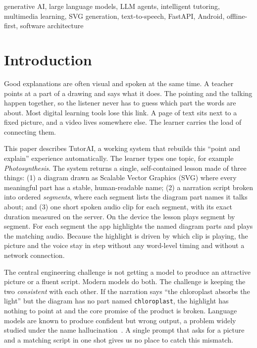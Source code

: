 \documentclass[conference]{IEEEtran}
\begin{document}
\begin{IEEEkeywords}
generative AI, large language models, LLM agents, intelligent tutoring,
multimedia learning, SVG generation, text-to-speech, FastAPI, Android,
offline-first, software architecture
\end{IEEEkeywords}

\section{Introduction}

Good explanations are often visual and spoken at the same time. A teacher
points at a part of a drawing and says what it does. The pointing and the
talking happen together, so the listener never has to guess which part the
words are about. Most digital learning tools lose this link. A page of text
sits next to a fixed picture, and a video lives somewhere else. The learner
carries the load of connecting them.

This paper describes TutorAI, a working system that rebuilds this ``point and
explain'' experience automatically. The learner types one topic, for example
\emph{Photosynthesis}. The system returns a single, self-contained lesson made
of three things: (1) a diagram drawn as Scalable Vector Graphics (SVG) where
every meaningful part has a stable, human-readable name; (2) a narration
script broken into ordered \emph{segments}, where each segment lists the
diagram part names it talks about; and (3) one short spoken audio clip for each
segment, with its exact duration measured on the server. On the device the
lesson plays segment by segment. For each segment the app highlights the named
diagram parts and plays the matching audio. Because the highlight is driven by
which clip is playing, the picture and the voice stay in step without any
word-level timing and without a network connection.

The central engineering challenge is not getting a model to produce an
attractive picture or a fluent script. Modern models do both. The challenge is
keeping the two \emph{consistent} with each other. If the narration says
``the chloroplast absorbs the light'' but the diagram has no part named
\texttt{chloroplast}, the highlight has nothing to point at and the core
promise of the product is broken. Language models are known to produce
confident but wrong output, a problem widely studied under the name
hallucination~\cite{ji2023hallucination}. A single prompt that asks for a
picture and a matching script in one shot gives us no place to catch this
mismatch.
\end{document}
